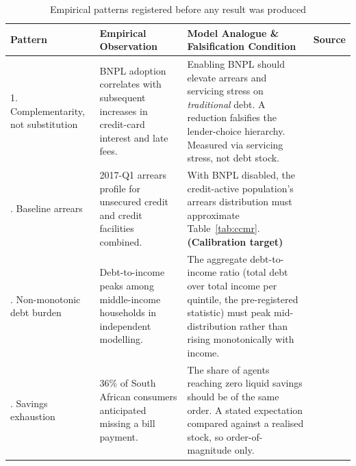 \begin{table}[H]
\centering
\caption{Empirical patterns registered before any result was produced}
\label{tab:patterns}
\begin{tabular}{L{2.4cm}L{4.2cm}L{4.8cm}L{1.5cm}}
\toprule
\textbf{Pattern} & \textbf{Empirical Observation} & \textbf{Model Analogue \& Falsification Condition} & \textbf{Source} \\
. Complementarity, not substitution & \ac{BNPL} adoption correlates with subsequent increases in credit-card interest and late fees. & Enabling \ac{BNPL} should elevate arrears and servicing stress on \emph{traditional} debt. A reduction falsifies the lender-choice hierarchy. Measured via servicing stress, not debt stock. & \cite{dehaan2024bnpl} \\
. Baseline arrears & 2017-Q1 arrears profile for unsecured credit and credit facilities combined. & With \ac{BNPL} disabled, the credit-active population's arrears distribution must approximate Table~\ref{tab:ccmr}. \textbf{(Calibration target)} & \cite{ncr_ccmr_2017} \\
. Non-monotonic debt burden & Debt-to-income peaks among middle-income households in independent modelling. & The aggregate debt-to-income ratio (total debt over total income per quintile, the pre-registered statistic) must peak mid-distribution rather than rising monotonically with income. & \cite{hamill2023creditcard} \\
. Savings exhaustion & 36\% of South African consumers anticipated missing a bill payment. & The share of agents reaching zero liquid savings should be of the same order. A stated expectation compared against a realised stock, so order-of-magnitude only. & \cite{transunion_cps_sa_2025} \\
\bottomrule
\end{tabular}
\end{table}

